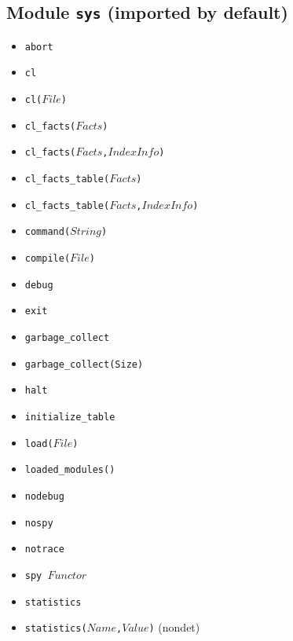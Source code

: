 \documentclass[10pt]{article}
\begin{document}
\begin{multicols}{2}
\section*{Module \texttt{sys} (imported by default)}
\begin{scriptsize}
\begin{itemize}
    \item \texttt{abort}
    \item \texttt{cl}
    \item \texttt{cl($File$)}
    \item \texttt{cl\_facts($Facts$)}
    \item \texttt{cl\_facts($Facts$,$IndexInfo$)}    
    \item \texttt{cl\_facts\_table($Facts$)}
    \item \texttt{cl\_facts\_table($Facts$,$IndexInfo$)}
    \item \texttt{command($String$)}
    \item \texttt{compile($File$)}
    \item \texttt{debug}
    \item \texttt{exit} 
    \item \texttt{garbage\_collect} 
    \item \texttt{garbage\_collect(Size)} 
    \item \texttt{halt} 
    \item \texttt{initialize\_table}
    \item \texttt{load($File$)}
    \item \texttt{loaded\_modules()}
    \item \texttt{nodebug}
    \item \texttt{nospy}
    \item \texttt{notrace}
    \item \texttt{spy $Functor$}
    \item \texttt{statistics}
    \item \texttt{statistics($Name$,$Value$)} (nondet) 

\end{itemize}
\end{scriptsize}
\end{multicols}
\end{document}
